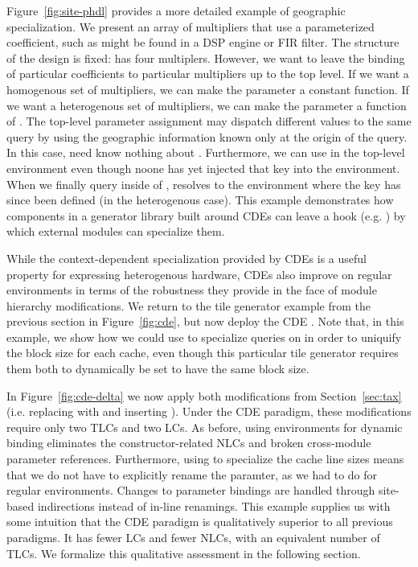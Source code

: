 Figure~\ref{fig:site-phdl} provides a more detailed example of geographic specialization.
We present an array of multipliers that use a parameterized coefficient, such as might be found in a DSP engine or FIR filter.
The structure of the design is fixed:  has four multiplers.
However, we want to leave the binding of particular coefficients to particular multipliers up to the top level.
If we want a homogenous set of multipliers, we can make the  parameter a constant function.
If we want a heterogenous set of multipliers, we can make the  parameter a function of .
The top-level parameter assignment may dispatch different values to the same query by using the geographic information known only at the origin of the query. 
In this case,  need know nothing about .
Furthermore, we can use  in the top-level environment even though noone has yet injected that key into the environment.
When we finally query  inside of ,  resolves to the environment where the  key has since been defined (in the heterogenous case).
This example demonstrates how components in a generator library built around CDEs can leave a hook (e.g. ) by which external modules can specialize them.

While the context-dependent specialization provided by CDEs is a useful property for expressing heterogenous hardware,
CDEs also improve on regular environments in terms of the robustness they provide in the face of module hierarchy modifications.
We return to the tile generator example from the previous section in Figure~\ref{fig:cde}, but now deploy the CDE .
Note that, in this example, we show how we could use
 to specialize queries on  in order to uniquify the block size for each cache,
even though this particular tile generator requires them both to dynamically be set to have the same block size.

In Figure~\ref{fig:cde-delta} we now apply both modifications from Section~\ref{sec:tax} (i.e. replacing  with  and inserting ).
Under the CDE paradigm, these modifications require only two TLCs and two LCs.
As before, using environments for dynamic binding eliminates the constructor-related NLCs and broken cross-module parameter references.
Furthermore, using  to specialize the cache line sizes means that we do not have to explicitly rename the  paramter, as we had to do for regular environments.
Changes to parameter bindings are handled through site-based indirections instead of in-line renamings.
This example supplies us with some intuition that the CDE paradigm is qualitatively superior to all previous paradigms.
It has fewer LCs and fewer NLCs, with an equivalent number of TLCs.
We formalize this qualitative assessment in the following section.


